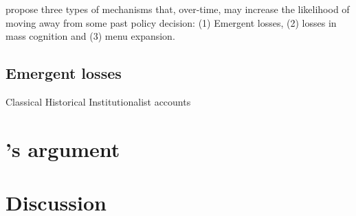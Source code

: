 \documentclass[11pt]{article}
\begin{document}





\textcite[][]{Jacobs2014} propose three types of mechanisms that, over-time, may increase the likelihood of moving away from some past policy decision: (1) Emergent losses, (2) losses in mass cognition and (3) menu expansion.


\subsection*{Emergent losses}

Classical Historical Institutionalist accounts



\section*{\citeauthor[][]{Jacobs2014}'s \parencite*{Jacobs2014} argument}


\section*{Discussion}


\newpage
\newpage
\thispagestyle{empty}
\begingroup
{}
\printbibliography
\endgroup
\end{document}
